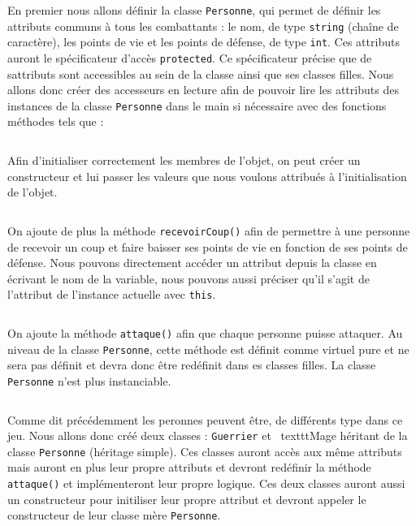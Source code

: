En premier nous allons définir la classe \texttt{Personne}, qui permet de définir les attributs communs à tous les combattants : le nom, de type \texttt{string} (chaîne de caractère), les points de vie et les points de défense, de type \texttt{int}. Ces attributs auront le spécificateur d’accès \texttt{protected}. Ce spécificateur précise que de sattributs sont accessibles au sein de la classe ainsi que ses classes filles.
Nous allons donc créer des accesseurs en lecture afin de pouvoir lire les attributs des instances de la classe \texttt{Personne} dans le main si nécessaire avec des fonctions méthodes tels que :

\inputminted[linenos,firstline=33, lastline=35]{cpp}{../sources/cpp/TP9-10/Personne.cpp}

Afin d'initialiser correctement les membres de l'objet, on peut créer un constructeur et lui passer les valeurs que nous voulons attribués à l'initialisation de l'objet.

\inputminted[linenos,firstline=9, lastline=13]{cpp}{../sources/cpp/TP9-10/Personne.cpp}

On ajoute de plus la méthode \texttt{recevoirCoup()} afin de permettre à une personne de recevoir un coup et faire baisser ses points de vie en fonction de ses points de défense. Nous pouvons directement accéder un attribut depuis la classe en écrivant le nom de la variable, nous pouvons aussi préciser qu'il s'agit de l'attribut de l'instance actuelle avec \texttt{this}.

\inputminted[linenos,firstline=23, lastline=27]{cpp}{../sources/cpp/TP9-10/Personne.cpp}

On ajoute la méthode \texttt{attaque()} afin que chaque personne puisse attaquer. Au niveau de la classe \texttt{Personne}, cette méthode est définit comme virtuel pure et ne sera pas définit et devra donc être redéfinit dans es classes filles. La classe \texttt{Personne} n'est plus instanciable.

\inputminted[linenos,firstline=14, lastline=38]{cpp}{../sources/cpp/TP9-10/Personne.h}

Comme dit précédemment les peronnes peuvent être, de différents type dans ce jeu. Nous allons donc créé deux classes : \texttt{Guerrier} et \ texttt{Mage} héritant de la classe \texttt{Personne} (héritage simple).
Ces classes auront accès aux même attributs mais auront en plus leur propre attributs et devront redéfinir la méthode \texttt{attaque()} et implémenteront leur propre logique.
Ces deux classes auront aussi un constructeur pour initiliser leur propre attribut et devront appeler le constructeur de leur classe mère \texttt{Personne}.

